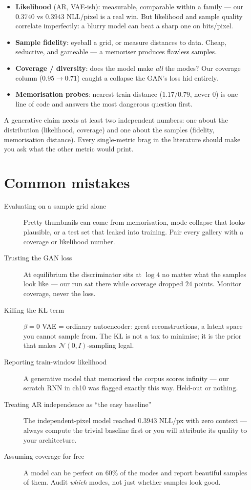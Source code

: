 \begin{itemize}
\item \textbf{Likelihood} (AR, VAE-ish): measurable, comparable within
a family --- our $0.3740$ vs $0.3943$ NLL/pixel is a real win. But
likelihood and sample quality correlate imperfectly: a blurry model
can beat a sharp one on bits/pixel.
\item \textbf{Sample fidelity}: eyeball a grid, or measure distances
to data. Cheap, seductive, and gameable --- a memoriser produces
flawless samples.
\item \textbf{Coverage / diversity}: does the model make \emph{all}
the modes? Our coverage column ($0.95 \to 0.71$) caught a collapse
the GAN's loss hid entirely.
\item \textbf{Memorisation probes}: nearest-train distance
($1.17/0.79$, never $0$) is one line of code and answers the most
dangerous question first.
\end{itemize}

\begin{principle}
A generative claim needs at least two independent numbers: one about
the distribution (likelihood, coverage) and one about the samples
(fidelity, memorisation distance). Every single-metric brag in the
literature should make you ask what the other metric would print.
\end{principle}

\section{Common mistakes}
\label{sec:genmistakes}

\begin{description}
\item[Evaluating on a sample grid alone] Pretty thumbnails can come
from memorisation, mode collapse that looks plausible, or a test set
that leaked into training. Pair every gallery with a coverage or
likelihood number.
\item[Trusting the GAN loss] At equilibrium the discriminator sits at
$\log 4$ no matter what the samples look like --- our run sat there
while coverage dropped $24$ points. Monitor coverage, never the loss.
\item[Killing the KL term] $\beta{=}0$ VAE = ordinary autoencoder:
great reconstructions, a latent space you cannot sample from. The KL
is not a tax to minimise; it is the prior that makes $\mathcal
N(0,I)$-sampling legal.
\item[Reporting train-window likelihood] A generative model that
memorised the corpus scores infinity --- our scratch RNN in ch10 was
flagged exactly this way. Held-out or nothing.
\item[Treating AR independence as ``the easy baseline''] The
independent-pixel model reached $0.3943$ NLL/px with zero context ---
always compute the trivial baseline first or you will attribute its
quality to your architecture.
\item[Assuming coverage for free] A model can be perfect on $60\%$ of
the modes and report beautiful samples of them. Audit \emph{which}
modes, not just whether samples look good.
\end{description}

